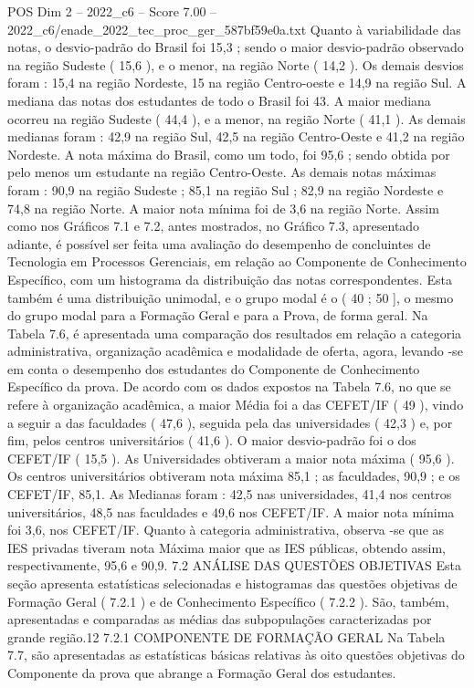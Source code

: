 \begin{textsample}{POS Dim 2 – 2022\_c6 – Score 7.00 – 2022\_c6/enade\_2022\_tec\_proc\_ger\_587bf59e0a.txt}
Quanto à variabilidade das notas, o desvio-padrão do Brasil foi 15,3 ; sendo o maior desvio-padrão observado na região Sudeste ( 15,6 ), e o menor, na região Norte ( 14,2 ).
Os demais desvios foram : 15,4 na região Nordeste, 15 na região Centro-oeste e 14,9 na região Sul.
A mediana das notas dos estudantes de todo o Brasil foi 43.
A maior mediana ocorreu na região Sudeste ( 44,4 ), e a menor, na região Norte ( 41,1 ).
As demais medianas foram : 42,9 na região Sul, 42,5 na região Centro-Oeste e 41,2 na região Nordeste.
A nota máxima do Brasil, como um todo, foi 95,6 ; sendo obtida por pelo menos um estudante na região Centro-Oeste.
As demais notas máximas foram : 90,9 na região Sudeste ; 85,1 na região Sul ; 82,9 na região Nordeste e 74,8 na região Norte.
A maior nota mínima foi de 3,6 na região Norte.
Assim como nos Gráficos 7.1 e 7.2, antes mostrados, no Gráfico 7.3, apresentado adiante, é possível ser feita uma avaliação do desempenho de concluintes de Tecnologia em Processos Gerenciais, em relação ao Componente de Conhecimento Específico, com um histograma da distribuição das notas correspondentes.
Esta também é uma distribuição unimodal, e o grupo modal é o ( 40 ; 50 ], o mesmo do grupo modal para a Formação Geral e para a Prova, de forma geral.
Na Tabela 7.6, é apresentada uma comparação dos resultados em relação a categoria administrativa, organização acadêmica e modalidade de oferta, agora, levando -se em conta o desempenho dos estudantes do Componente de Conhecimento Específico da prova.
De acordo com os dados expostos na Tabela 7.6, no que se refere à organização acadêmica, a maior Média foi a das CEFET/IF ( 49 ), vindo a seguir a das faculdades ( 47,6 ), seguida pela das universidades ( 42,3 ) e, por fim, pelos centros universitários ( 41,6 ).
O maior desvio-padrão foi o dos CEFET/IF ( 15,5 ).
As Universidades obtiveram a maior nota máxima ( 95,6 ).
Os centros universitários obtiveram nota máxima 85,1 ; as faculdades, 90,9 ; e os CEFET/IF, 85,1.
As Medianas foram : 42,5 nas universidades, 41,4 nos centros universitários, 48,5 nas faculdades e 49,6 nos CEFET/IF.
A maior nota mínima foi 3,6, nos CEFET/IF.
Quanto à categoria administrativa, observa -se que as IES privadas tiveram nota Máxima maior que as IES públicas, obtendo assim, respectivamente, 95,6 e 90,9. 7.2 ANÁLISE DAS QUESTÕES OBJETIVAS Esta seção apresenta estatísticas selecionadas e histogramas das questões objetivas de Formação Geral ( 7.2.1 ) e de Conhecimento Específico ( 7.2.2 ).
São, também, apresentadas e comparadas as médias das subpopulações caracterizadas por grande região.12 7.2.1 COMPONENTE DE FORMAÇÃO GERAL Na Tabela 7.7, são apresentadas as estatísticas básicas relativas às oito questões objetivas do Componente da prova que abrange a Formação Geral dos estudantes.

\end{textsample}
